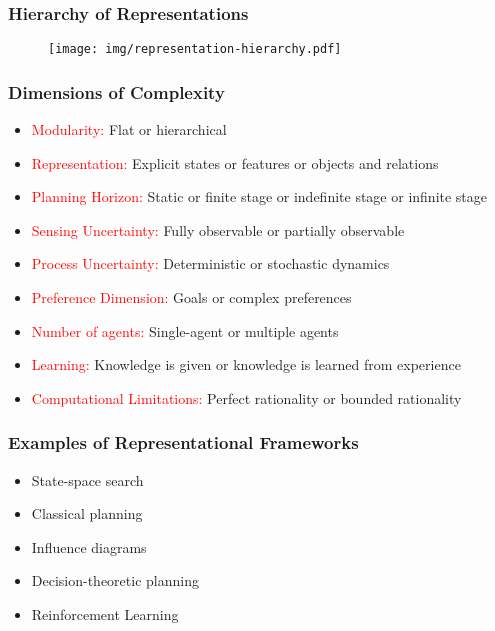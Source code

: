 \documentclass[UTF8,11pt,colorlinks,compress,openany]{beamer}%
\begin{document}
\begin{frame}\frametitle{Hierarchy of Representations}
\begin{figure}[H]
	\texttt{[image: img/representation-hierarchy.pdf]}
\end{figure}
\end{frame}

\begin{frame}\frametitle{Dimensions of Complexity}
\begin{itemize}
	\item \textcolor{red}{Modularity:} Flat or hierarchical
	\item \textcolor{red}{Representation:} Explicit states or features or objects and relations
	\item \textcolor{red}{Planning Horizon:} Static or finite stage or indefinite stage or infinite stage
	\item \textcolor{red}{Sensing Uncertainty:} Fully observable or partially observable
	\item \textcolor{red}{Process Uncertainty:} Deterministic or stochastic dynamics
	\item \textcolor{red}{Preference Dimension:} Goals or complex preferences
	\item \textcolor{red}{Number of agents:} Single-agent or multiple agents
	\item \textcolor{red}{Learning:} Knowledge is given or knowledge is learned from experience
	\item \textcolor{red}{Computational Limitations:} Perfect rationality or bounded rationality
\end{itemize}
\end{frame}

\begin{frame}\frametitle{Examples of Representational Frameworks}
\begin{itemize}
	\item State-space search
	\item Classical planning
	\item Influence diagrams
	\item Decision-theoretic planning
	\item Reinforcement Learning
\end{itemize}
\end{frame}
\end{document}
